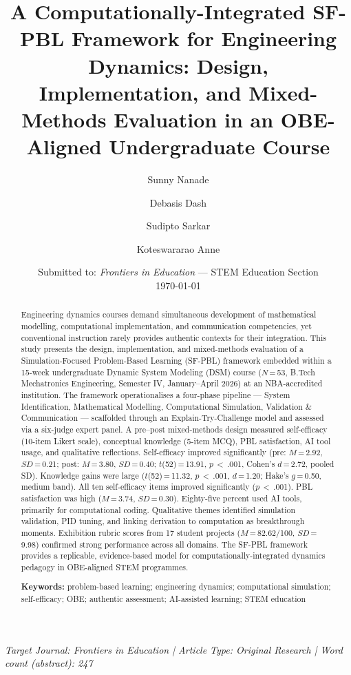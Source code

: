 \documentclass[12pt, a4paper]{article}
\title{\textbf{A Computationally-Integrated SF-PBL Framework for
Engineering Dynamics: Design, Implementation, and Mixed-Methods
Evaluation in an OBE-Aligned Undergraduate Course}}
\author[1*]{Sunny Nanade}
\author[1]{Debasis Dash}
\author[1]{Sudipto Sarkar}
\author[1]{Koteswararao Anne}
\affil[1]{Mukesh Patel School of Technology Management \& Engineering, SVKM's NMIMS, Mumbai, India}
\affil[*]{Corresponding author: \href{mailto:sunny.nanade@nmims.edu}{sunny.nanade@nmims.edu} | ORCID: 0000-0001-7098-1084}
\date{Submitted to: \textit{Frontiers in Education} ---
STEM Education Section \\ \today}
\begin{document}
\maketitle
\thispagestyle{empty}

\begin{center}
  \small\textit{Target Journal: Frontiers in Education |
  Article Type: Original Research | Word count (abstract): 247}
\end{center}

\vspace{1em}

\begin{abstract}
\noindent
Engineering dynamics courses demand simultaneous development of
mathematical modelling, computational implementation, and
communication competencies, yet conventional instruction rarely
provides authentic contexts for their integration. This study
presents the design, implementation, and mixed-methods evaluation
of a Simulation-Focused Problem-Based Learning (SF-PBL) framework
embedded within a 15-week undergraduate Dynamic System Modeling
(DSM) course ($N$\,=\,53, B.Tech Mechatronics Engineering, Semester
IV, January--April 2026) at an NBA-accredited institution. The
framework operationalises a four-phase pipeline --- System
Identification, Mathematical Modelling, Computational Simulation,
Validation \& Communication --- scaffolded through an
Explain-Try-Challenge model and assessed via a six-judge expert
panel. A pre--post mixed-methods design measured self-efficacy
(10-item Likert scale), conceptual knowledge (5-item MCQ), PBL
satisfaction, AI tool usage, and qualitative reflections.
Self-efficacy improved significantly (pre: $M$\,=\,2.92,
$SD$\,=\,0.21; post: $M$\,=\,3.80, $SD$\,=\,0.40;
$t$(52)\,=\,13.91, $p$\,$<$\,.001, Cohen's $d$\,=\,2.72, pooled
SD). Knowledge gains were large ($t$(52)\,=\,11.32,
$p$\,$<$\,.001, $d$\,=\,1.20; Hake's $g$\,=\,0.50, medium band).
All ten self-efficacy items improved significantly ($p$\,$<$\,.001).
PBL satisfaction was high ($M$\,=\,3.74, $SD$\,=\,0.30).
Eighty-five percent used AI tools, primarily for computational
coding. Qualitative themes identified simulation validation, PID
tuning, and linking derivation to computation as breakthrough
moments. Exhibition rubric scores from 17 student projects
($M$\,=\,82.62/100, $SD$\,=\,9.98) confirmed strong performance
across all domains. The SF-PBL framework provides a replicable,
evidence-based model for computationally-integrated dynamics
pedagogy in OBE-aligned STEM programmes.

\bigskip
\noindent\textbf{Keywords:} problem-based learning; engineering
dynamics; computational simulation; self-efficacy; OBE; authentic
assessment; AI-assisted learning; STEM education
\end{abstract}
\end{document}
